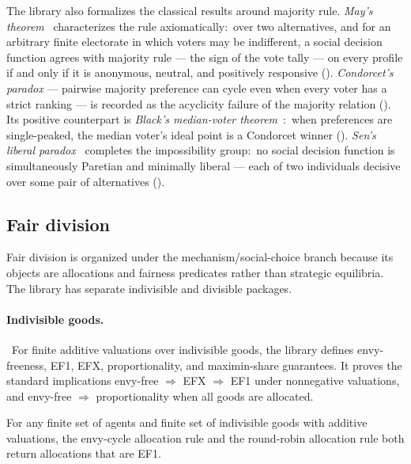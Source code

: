 The library also formalizes the classical results around majority
rule.  \emph{May's theorem}~\citep{May1952} characterizes the rule
axiomatically:\ over two alternatives, and for an arbitrary finite
electorate in which voters may be indifferent, a social decision
function agrees with majority rule --- the sign of the vote tally ---
on every profile if and only if it is anonymous, neutral, and
positively responsive ().  \emph{Condorcet's paradox}
--- pairwise majority preference can
cycle even when every voter has a strict ranking --- is recorded as
the acyclicity failure of the majority relation
().  Its positive counterpart is
\emph{Black's median-voter theorem}~\citep{Black1948}:\ when
preferences are single-peaked, the median voter's ideal point is a
Condorcet winner ().  \emph{Sen's
liberal paradox}~\citep{Sen1970} completes the impossibility group:\
no social decision function is simultaneously Paretian and minimally
liberal --- each of two individuals decisive over some pair of
alternatives ().


\subsection{Fair division}
\label{sec:mech:fair-division}

Fair division is organized under the mechanism/social-choice branch
because its objects are allocations and fairness predicates rather
than strategic equilibria.  The library has separate indivisible and
divisible packages.

\paragraph{Indivisible goods.}\
For finite additive valuations over indivisible goods, the library
defines envy-freeness, EF1, EFX, proportionality, and maximin-share
guarantees.  It proves the standard implications
envy-free $\Rightarrow$ EFX $\Rightarrow$ EF1 under nonnegative
valuations, and envy-free $\Rightarrow$ proportionality when all goods
are allocated.

\begin{theorem}
\label{thm:indivisible-ef1}
For any finite set of agents and finite set of indivisible goods with
additive valuations, the envy-cycle allocation rule and the
round-robin allocation rule both return allocations that are EF1.
\end{theorem}

